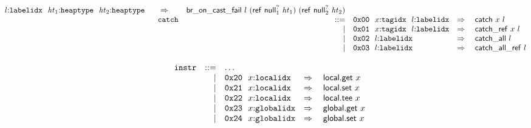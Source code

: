$$\begin{array}[t]{@{}lrrl@{}l@{}l@{}l@{}}
\begin{array}[t]{@{}l@{}}
  l{:}{\mathtt{labelidx}}~~{\mathit{ht}}_1{:}{\mathtt{heaptype}}~~{\mathit{ht}}_2{:}{\mathtt{heaptype}} \end{array} & \quad\Rightarrow\quad{} & \mathsf{br\_on\_cast\_fail}~l~(\mathsf{ref}~{{\mathsf{null}}_1^?}~{\mathit{ht}}_1)~(\mathsf{ref}~{{\mathsf{null}}_2^?}~{\mathit{ht}}_2) \\
& {\mathtt{catch}} & ::= & \mathtt{0x00}~~x{:}{\mathtt{tagidx}}~~l{:}{\mathtt{labelidx}} & \quad\Rightarrow\quad{} & \mathsf{catch}~x~l \\
& & | & \mathtt{0x01}~~x{:}{\mathtt{tagidx}}~~l{:}{\mathtt{labelidx}} & \quad\Rightarrow\quad{} & \mathsf{catch\_ref}~x~l \\
& & | & \mathtt{0x02}~~l{:}{\mathtt{labelidx}} & \quad\Rightarrow\quad{} & \mathsf{catch\_all}~l \\
& & | & \mathtt{0x03}~~l{:}{\mathtt{labelidx}} & \quad\Rightarrow\quad{} & \mathsf{catch\_all\_ref}~l \\
\end{array}
$$

\vspace{1ex}

$$
\begin{array}[t]{@{}lrrl@{}l@{}l@{}l@{}}
& {\mathtt{instr}} & ::= & \dots \\
& & | & \mathtt{0x20}~~x{:}{\mathtt{localidx}} & \quad\Rightarrow\quad{} & \mathsf{local{.}get}~x \\
& & | & \mathtt{0x21}~~x{:}{\mathtt{localidx}} & \quad\Rightarrow\quad{} & \mathsf{local{.}set}~x \\
& & | & \mathtt{0x22}~~x{:}{\mathtt{localidx}} & \quad\Rightarrow\quad{} & \mathsf{local{.}tee}~x \\
& & | & \mathtt{0x23}~~x{:}{\mathtt{globalidx}} & \quad\Rightarrow\quad{} & \mathsf{global{.}get}~x \\
& & | & \mathtt{0x24}~~x{:}{\mathtt{globalidx}} & \quad\Rightarrow\quad{} & \mathsf{global{.}set}~x \\
\end{array}
$$

\vspace{1ex}

